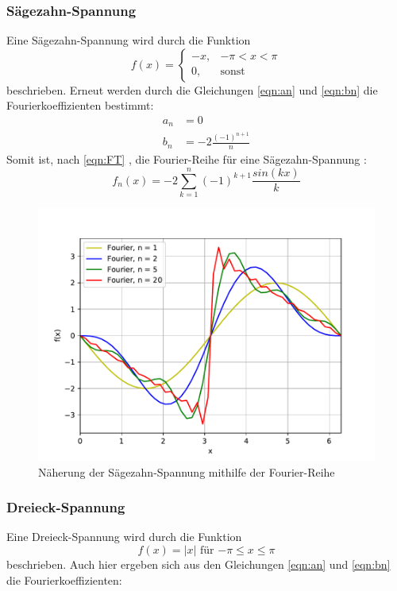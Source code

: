 \subsubsection{Sägezahn-Spannung}
Eine Sägezahn-Spannung wird durch die Funktion
\begin{equation}
  f(x) =
  \begin{cases}
    -x , & \text{$-\pi < x < \pi$} \\
     0, & \text{sonst}
\end{cases}
\end{equation}
beschrieben.
Erneut werden durch die Gleichungen \eqref{eqn:an} und \eqref{eqn:bn} die Fourierkoeffizienten bestimmt:
\begin{align}
  a_n &= 0 \\
  b_n &= -2\frac{(-1)^{n+1}}{n}
\end{align}
Somit ist, nach \eqref{eqn:FT} , die Fourier-Reihe für eine Sägezahn-Spannung :
\begin{equation}
  f_n(x) = -2\sum\limits_{k=1}^{n}(-1)^{k+1}\frac{sin{(kx)}}{k}
\end{equation}


\begin{figure}[H]
  \centering
  \includegraphics[scale=0.7]{Plots/Fourier/sf.pdf}
  \caption{Näherung der Sägezahn-Spannung mithilfe der Fourier-Reihe}
  \label{fig:sf}
\end{figure}

\subsubsection{Dreieck-Spannung}
Eine Dreieck-Spannung wird durch die Funktion
\begin{equation}
  f(x) =|x| \text{ für $-\pi \le x \le \pi$}
\end{equation}
beschrieben.
Auch hier ergeben sich aus den Gleichungen \eqref{eqn:an} und \eqref{eqn:bn} die Fourierkoeffizienten:


